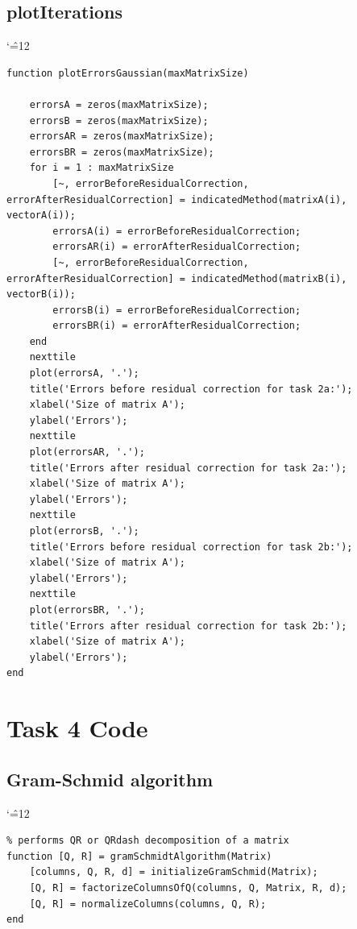 \documentclass[12pt]{report}
\newenvironment{simplechar}{%
   \catcode`\^=12
}{}
\begin{document}
\subsection{plotIterations}
\begin{simplechar}
\begin{lstlisting}
function plotErrorsGaussian(maxMatrixSize)

    errorsA = zeros(maxMatrixSize);
    errorsB = zeros(maxMatrixSize);
    errorsAR = zeros(maxMatrixSize);
    errorsBR = zeros(maxMatrixSize);
    for i = 1 : maxMatrixSize
        [~, errorBeforeResidualCorrection, errorAfterResidualCorrection] = indicatedMethod(matrixA(i), vectorA(i));
        errorsA(i) = errorBeforeResidualCorrection;
        errorsAR(i) = errorAfterResidualCorrection;
        [~, errorBeforeResidualCorrection, errorAfterResidualCorrection] = indicatedMethod(matrixB(i), vectorB(i));
        errorsB(i) = errorBeforeResidualCorrection;
        errorsBR(i) = errorAfterResidualCorrection;
    end
    nexttile
    plot(errorsA, '.');
    title('Errors before residual correction for task 2a:');
    xlabel('Size of matrix A');
    ylabel('Errors');
    nexttile
    plot(errorsAR, '.');
    title('Errors after residual correction for task 2a:');
    xlabel('Size of matrix A');
    ylabel('Errors');
    nexttile
    plot(errorsB, '.');
    title('Errors before residual correction for task 2b:');
    xlabel('Size of matrix A');
    ylabel('Errors');
    nexttile
    plot(errorsBR, '.');
    title('Errors after residual correction for task 2b:');
    xlabel('Size of matrix A');
    ylabel('Errors');
end
\end{lstlisting}
\end{simplechar}

\section{Task 4 Code}
\subsection{Gram-Schmid algorithm}

\begin{simplechar}
\begin{lstlisting}
% performs QR or QRdash decomposition of a matrix
function [Q, R] = gramSchmidtAlgorithm(Matrix)
    [columns, Q, R, d] = initializeGramSchmid(Matrix);
    [Q, R] = factorizeColumnsOfQ(columns, Q, Matrix, R, d);
    [Q, R] = normalizeColumns(columns, Q, R);
end
\end{lstlisting}
\end{simplechar}
\end{document}
